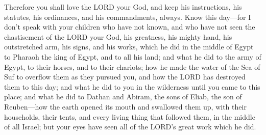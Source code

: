\mychapter{} \myverse*{}Therefore you shall love the LORD your God, and keep his instructions,
his statutes, his ordinances, and his commandments, always.
\myverse{}Know this day—for I don’t speak with your children who have not known, and
who have not seen the chastisement of the LORD your God, his greatness, his mighty hand, his outstretched
arm,
\myverse{}his signs, and his works, which he did in the middle of Egypt to Pharaoh the
king of Egypt, and to all his land;
\myverse{}and what he did to the army of Egypt, to their horses, and to their chariots;
how he made the water of the Sea of Suf to overflow them as they pursued you, and how the LORD has destroyed
them to this day;
\myverse{}and what he did to you in the wilderness until you came to this place;
\myverse{}and what he did to Dathan and Abiram, the sons of Eliab, the son of Reuben—how
the earth opened its mouth and swallowed them up, with their households, their tents, and every living
thing that followed them, in the middle of all Israel;
\myverse{}but your eyes have seen all of the LORD’s great work which he did.


